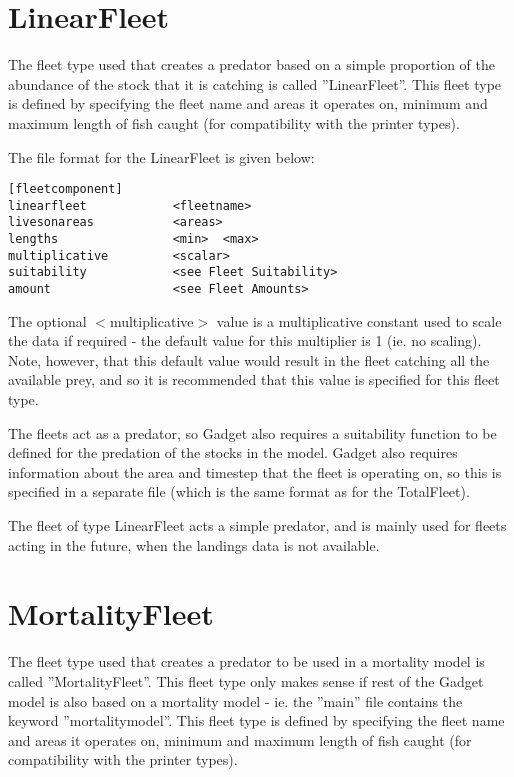 \documentclass [a4paper, 10pt]{book}
\begin{document}
\section{LinearFleet}\label{sec:linearfleet}
The fleet type used that creates a predator based on a simple proportion of the abundance of the stock that it is catching is called ''LinearFleet''.  This fleet type is defined by specifying the fleet name and areas it operates on, minimum and maximum length of fish caught (for compatibility with the printer types).

\bigskip
The file format for the LinearFleet is given below:

\begin{verbatim}
[fleetcomponent]
linearfleet            <fleetname>
livesonareas           <areas>
lengths                <min>  <max>
multiplicative         <scalar>
suitability            <see Fleet Suitability>
amount                 <see Fleet Amounts>
\end{verbatim}

The optional $<$multiplicative$>$ value is a multiplicative constant used to scale the data if required - the default value for this multiplier is 1 (ie. no scaling).  Note, however, that this default value would result in the fleet catching all the available prey, and so it is recommended that this value is specified for this fleet type.

\bigskip
The fleets act as a predator, so Gadget also requires a suitability function to be defined for the predation of the stocks in the model.  Gadget also requires information about the area and timestep that the fleet is operating on, so this is specified in a separate file (which is the same format as for the TotalFleet).

\bigskip
The fleet of type LinearFleet acts a simple predator, and is mainly used for fleets acting in the future, when the landings data is not available.

\section{MortalityFleet}\label{sec:mortalityfleet}
The fleet type used that creates a predator to be used in a mortality model is called ''MortalityFleet''.  This fleet type only makes sense if rest of the Gadget model is also based on a mortality model - ie. the ''main'' file contains the keyword ''mortalitymodel''.  This fleet type is defined by specifying the fleet name and areas it operates on, minimum and maximum length of fish caught (for compatibility with the printer types).
\end{document}
